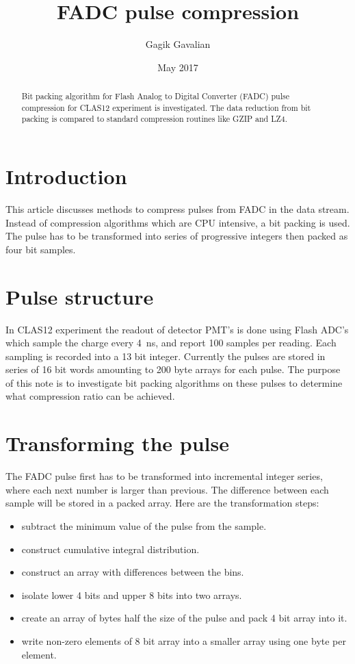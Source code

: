 \documentclass[12pt]{article}
\title{FADC pulse compression}
\author{Gagik Gavalian}
\date{May 2017}
\begin{document}
\begin{titlepage}
\maketitle
\begin{abstract}
Bit packing algorithm for Flash Analog to Digital Converter (FADC) pulse compression
for CLAS12 experiment is investigated. The data reduction from bit packing is compared 
to standard compression routines like GZIP and LZ4. 

\end{abstract}
\end{titlepage}

\section{Introduction}

This article discusses methods to compress pulses from FADC in the data stream.
Instead of compression algorithms which are CPU intensive, a bit packing is used.
The pulse has to be transformed into series of progressive integers then packed
as four bit samples.

\section{Pulse structure}

In CLAS12 experiment the readout of detector PMT's is done using Flash ADC's which
sample the charge every 4~ns, and report 100 samples per reading. Each sampling is 
recorded into a 13 bit integer.  Currently the pulses are stored in series of 16 bit words
amounting to 200 byte arrays for each pulse. The purpose of this note is to investigate
bit packing algorithms on these pulses to determine what compression ratio can be 
achieved.

\section{Transforming the pulse}

The FADC pulse first has to be transformed into incremental integer series, where
each next number is larger than previous. The difference between each sample will
be stored in a packed array. Here are the transformation steps:

\begin{itemize}
\item subtract the minimum value of the pulse from the sample.
\item construct cumulative integral distribution.
\item construct an array with differences between the bins.
\item isolate lower 4 bits and upper 8 bits into two arrays.
\item create an array of bytes half the size of the pulse and pack 4 bit array into it.
\item write non-zero elements of 8 bit array into a smaller array using one byte per element.
\end{itemize} 
\end{document}
